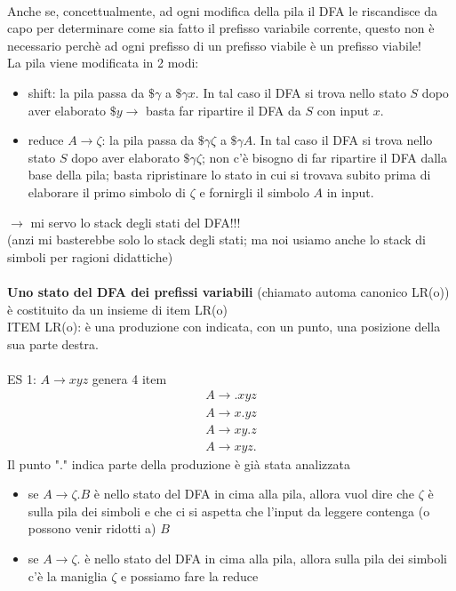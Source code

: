 \documentclass[a4paper,12pt]{article}
\begin{document}
{\vspace{1em} \\
Anche se, concettualmente, ad ogni modifica della pila il DFA le riscandisce da capo per determinare come sia fatto il prefisso variabile corrente, questo non è necessario perchè ad ogni prefisso di un prefisso viabile è un prefisso viabile! \\
La pila viene modificata in 2 modi:
\begin{itemize}
  \item shift: la pila passa da $\mathdollar \gamma $ a $\mathdollar \gamma x$. In tal caso il DFA si trova nello stato $S$ dopo aver elaborato $\mathdollar y \to$ basta far ripartire il DFA da $S$ con input $x$.
  \item reduce $A \to \zeta$: la pila passa da $\mathdollar \gamma \zeta$ a $\mathdollar \gamma A$. In tal caso il DFA si trova nello stato $S$ dopo aver elaborato $\mathdollar \gamma \zeta$; non c'è bisogno di far ripartire il DFA dalla base della pila; basta ripristinare lo stato in cui si trovava subito prima di elaborare il primo simbolo di $\zeta$ e fornirgli il simbolo $A$ in input.
\end{itemize}
$\to$ mi servo lo stack degli stati del DFA!!! \\
(anzi mi basterebbe solo lo stack degli stati; ma noi usiamo anche lo stack di simboli per ragioni didattiche) \\
\vspace{1em} \\
\textbf{Uno stato del DFA dei prefissi variabili} (chiamato automa canonico LR(o)) è costituito da un insieme di item LR(o) \\
ITEM LR(o): è una produzione con indicata, con un punto, una posizione della sua parte destra. \\
\vspace{5px} \\
ES 1: $A \to xyz$ genera 4 item
\begin{align*}
  A \to .xyz \\
  A \to x.yz \\
  A \to xy.z \\ 
  A \to xyz.
\end{align*}
Il punto "." indica parte della produzione è già stata analizzata 
\begin{itemize}
  \item se $A \to \zeta . B$ è nello stato del DFA in cima alla pila, allora vuol dire che $\zeta$ è sulla pila dei simboli e che ci si aspetta che l'input da leggere contenga (o possono venir ridotti a) $B$ \\
  \item se $A \to \zeta .$ è nello stato del DFA in cima alla pila, allora sulla pila dei simboli c'è la maniglia $\zeta$ e possiamo fare la reduce
\end{itemize}
\vspace{1em} 
}
\end{document}
